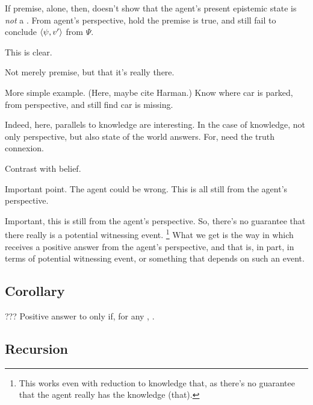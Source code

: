 \begin{note}
  \begin{argument}
    If premise, alone, then, doesn't show that the agent's present epistemic state is \emph{not} a \deadEnd{}.
    From agent's perspective, hold the premise is true, and still fail to conclude \(\langle \psi, v' \rangle\) from \(\Psi\).

    This is clear.

    Not merely premise, but that it's really there.

    More simple example.
    (Here, maybe cite Harman.)
    Know where car is parked, from perspective, and still find car is missing.

    Indeed, here, parallels to knowledge are interesting.
    In the case of knowledge, not only perspective, but also state of the world answers.
    For, need the truth connexion.

    Contrast with belief.

    Important point.
    The agent could be wrong.
    This is all still from the agent's perspective.
  \end{argument}

  Important, this is still from the agent's perspective.
  So, there's no guarantee that there really is a potential witnessing event.%
  \footnote{
    This works even with reduction to knowledge that, as there's no guarantee that the agent really has the knowledge (that).
  }
  What we get is the way in which \qzS{} receives a positive answer from the agent's perspective, and that is, in part, in terms of potential witnessing event, or something that depends on such an event.
\end{note}

\subsection{Corollary}
\label{cha:zSpA:sec:corollary}

\begin{note}
  \begin{corollary}
    \label{corr:prop:PWEs}
    {
      \color{red} ???
    }
    Positive answer to \qzS{} only if, for any \requ{}, \support{}.
  \end{corollary}
\end{note}

\subsection{Recursion}
\label{cha:zS:sec:question:recursion}

